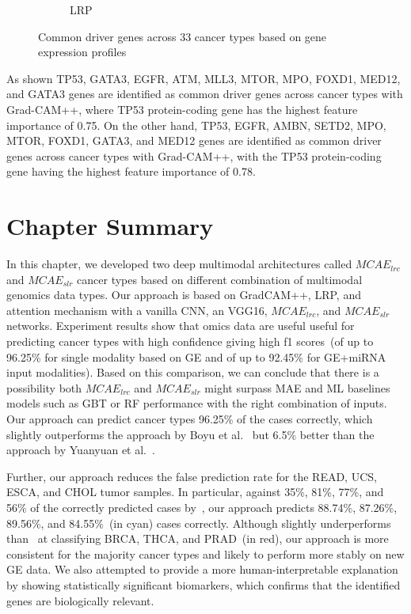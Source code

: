 \begin{figure}[h]
\begin{subfigure}{0.48\linewidth}
		\caption{LRP}
        \label{fig:comgeneglrp}
	\end{subfigure}
	\caption{Common driver genes across 33 cancer types based on gene expression profiles} 
	\label{fig:comgenes}
\end{figure}

\hspace*{3.5mm} As shown TP53, GATA3, EGFR, ATM, MLL3, MTOR, MPO, FOXD1, MED12, and GATA3 genes are identified as common driver genes across cancer types with Grad-CAM++, where TP53 protein-coding gene has the highest feature importance of 0.75. On the other hand, TP53, EGFR, AMBN, SETD2, MPO, MTOR, FOXD1, GATA3, and MED12 genes are identified as common driver genes across cancer types with Grad-CAM++, with the TP53 protein-coding gene having the highest feature importance of 0.78. 

\section{Chapter Summary}\label{chapter_5:conclusion}
In this chapter, we developed two deep multimodal architectures called $MCAE_{lrc}$ and $MCAE_{slr}$ cancer types based on different combination of multimodal genomics data types. Our approach is based on GradCAM++, LRP, and attention mechanism with a vanilla CNN, an VGG16, $MCAE_{lrc}$, and $MCAE_{slr}$ networks. Experiment results show that omics data are useful useful for predicting cancer types with high confidence giving high f1 scores~(of up to 96.25\% for single modality based on GE and of up to 92.45\% for GE+miRNA input modalities). Based on this comparison, we can conclude that there is a possibility both $MCAE_{lrc}$ and $MCAE_{slr}$ might surpass MAE and ML baselines models such as GBT or RF performance with the right combination of inputs. 
Our approach can predict cancer types 96.25\% of the cases correctly, which slightly outperforms the approach by Boyu et al.~\cite{lyu2018deep} but 6.5\% better than the approach by Yuanyuan et al.~\cite{li2017comprehensive}. 

\hspace*{3.5mm}Further, our approach reduces the false prediction rate for the READ, UCS, ESCA, and CHOL tumor samples. In particular, against 35\%, 81\%, 77\%, and 56\% of the correctly predicted cases by~\cite{lyu2018deep}, our approach predicts 88.74\%, 87.26\%, 89.56\%, and 84.55\%~(in cyan) cases correctly. Although slightly underperforms than~\cite{lyu2018deep} at classifying BRCA, THCA, and PRAD~(in red), our approach is more consistent for the majority cancer types and likely to perform more stably on new GE data. We also attempted to provide a more human-interpretable explanation by showing statistically significant biomarkers, which confirms that the identified genes are biologically relevant. 

